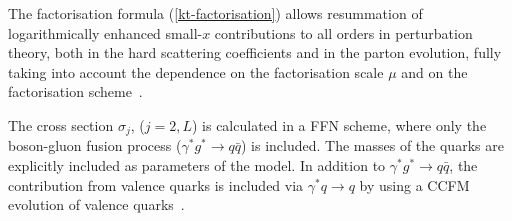 The factorisation formula (\ref{kt-factorisation})  
allows resummation of logarithmically enhanced small-$x$ contributions  
to all orders in perturbation theory,  
both in the  hard scattering coefficients and 
in the parton evolution, fully taking into account the 
dependence on the factorisation scale $\mu$ and on the 
factorisation scheme~\cite{Catani:1994sq,Catani:1993rn}.  
 
The cross section $\sigma_j$, ($j= 2, L$) is calculated in a FFN scheme, where
only the boson-gluon fusion process ($\gamma^* g^* \to q \bar{q}$) is included. The masses of the 
quarks are explicitly included as parameters of the model.
In addition to $\gamma^* g^* \to q\bar{q}$,  the contribution from valence quarks is included 
via $\gamma^* q \to q$ by using a CCFM evolution of 
valence quarks~\cite{Deak:2010gk,Hautmann:2013tba}. 

